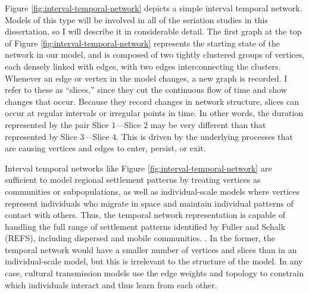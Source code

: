 Figure \ref{fig:interval-temporal-network} depicts a simple interval temporal network.  Models of this type will be involved in all of the seriation studies in this dissertation, so I will describe it in considerable detail.  The first graph at the top of Figure \ref{fig:interval-temporal-network} represents the starting state of the network in our model, and is composed of two tightly clustered groups of vertices, each densely linked with edges, with two edges interconnecting the clusters.  Whenever an edge or vertex in the model changes, a new graph is recorded.  I refer to these as ``slices,'' since they cut the continuous flow of time and show changes that occur.  Because they record changes in network structure, slices can occur at regular intervals or irregular points in time.  In other words, the duration represented by the pair Slice 1---Slice 2 may be very different than that represented by Slice 3---Slice 4.  This is driven by the underlying processes that are causing vertices and edges to enter, persist, or exit.  

Interval temporal networks like Figure \ref{fig:interval-temporal-network} are sufficient to model regional settlement patterns by treating vertices as communities or subpopulations, as well as individual-scale models where vertices represent individuals who migrate in space and maintain individual patterns of contact with others.  Thus, the temporal network representation is capable of handling the full range of settlement patterns identified by Fuller and Schalk (REFS), including dispersed and mobile communities. .  In the former, the temporal network would have a smaller number of vertices and slices than in an individual-scale model, but this is irrelevant to the structure of the model.  In any case, cultural transmission models use the edge weights and topology to constrain which individuals interact and thus learn from each other.  

